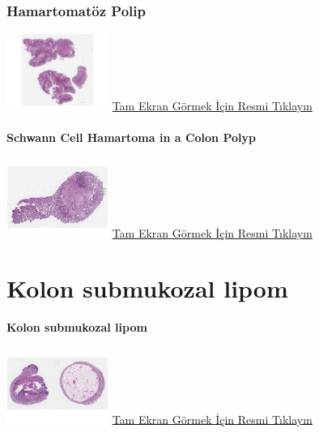 \documentclass[
  letterpaper,
  DIV=11,
  numbers=noendperiod]{scrreprt}
\begin{document}
\hypertarget{sec-kolon-hamartomatoz-polip}{%
\subsection{Hamartomatöz Polip}\label{sec-kolon-hamartomatoz-polip}}

\href{https://images.patolojiatlasi.com/hamartomatouspolyp/HE.html}{\includegraphics[width=0.25\textwidth,height=\textheight]{./screenshots/thumbnail_hamartomatouspolyp.png}}
\href{https://images.patolojiatlasi.com/hamartomatouspolyp/HE.html}{Tam
Ekran Görmek İçin Resmi Tıklayın}

\hypertarget{sec-colon-schwann-cell-hamartoma}{%
\subsubsection{Schwann Cell Hamartoma in a Colon
Polyp}\label{sec-colon-schwann-cell-hamartoma}}

\href{https://images.patolojiatlasi.com/schwanncellhamartoma/HE.html}{\includegraphics[width=0.25\textwidth,height=\textheight]{./screenshots/thumbnail_schwanncellhamartoma.png}}
\href{https://images.patolojiatlasi.com/schwanncellhamartoma/HE.html}{Tam
Ekran Görmek İçin Resmi Tıklayın}

\hypertarget{sec-kolon-intramukozal-lipom}{%
\chapter{Kolon submukozal lipom}\label{sec-kolon-intramukozal-lipom}}

\textbf{Kolon submukozal lipom}

\href{https://images.patolojiatlasi.com/colon-submucosal-lipoma/HE.html}{\includegraphics[width=0.25\textwidth,height=\textheight]{./screenshots/thumbnail_colon-submucosal-lipoma.png}}
\href{https://images.patolojiatlasi.com/colon-submucosal-lipoma/HE.html}{Tam
Ekran Görmek İçin Resmi Tıklayın}
\end{document}
